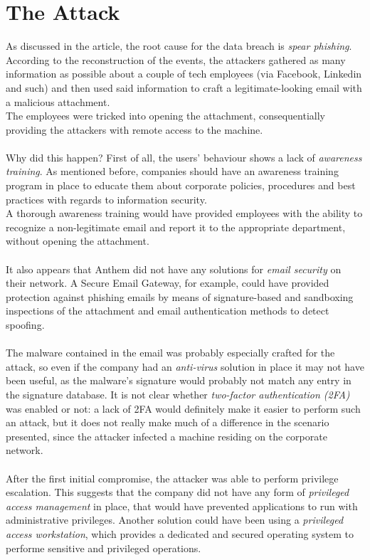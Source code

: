 \documentclass[12pt]{extarticle}
\begin{document}
	\section{The Attack}
	As discussed in the article, the root cause for the data breach is \textit{spear phishing}. According to the reconstruction of the events, the attackers gathered as many information as possible about a couple of tech employees (via Facebook, Linkedin and such) and then used said information to craft a legitimate-looking email with a malicious attachment. \\
	The employees were tricked into opening the attachment, consequentially providing the attackers with remote access to the machine.\\\\
	Why did this happen? First of all, the users' behaviour shows a lack of \textit{awareness training}. As mentioned before, companies should have an awareness training program in place to educate them about corporate policies, procedures and best practices with regards to information security.\\
	A thorough awareness training would have provided employees with the ability to recognize a non-legitimate email and report it to the appropriate department, without opening the attachment.\\\\
	It also appears that Anthem did not have any solutions for \textit{email security} on their network. A Secure Email Gateway, for example, could have provided protection against phishing emails by means of signature-based and sandboxing inspections of the attachment and email authentication methods to detect spoofing.\\\\
	The malware contained in the email was probably especially crafted for the attack, so even if the company had an \textit{anti-virus} solution in place it may not have been useful, as the malware's signature would probably not match any entry in the signature database. It is not clear whether \textit{two-factor authentication (2FA)} was enabled or not: a lack of 2FA would definitely make it easier to perform such an attack, but it does not really make much of a difference in the scenario presented, since the attacker infected a machine residing on the corporate network.\\\\
	After the first initial compromise, the attacker was able to perform privilege escalation. This suggests that the company did not have any form of \textit{privileged access management} in place, that would have prevented applications to run with administrative privileges. Another solution could have been using a \textit{privileged access workstation}, which provides a dedicated and secured operating system to performe sensitive and privileged operations\cite{paws}.\\\\ %
\end{document}
